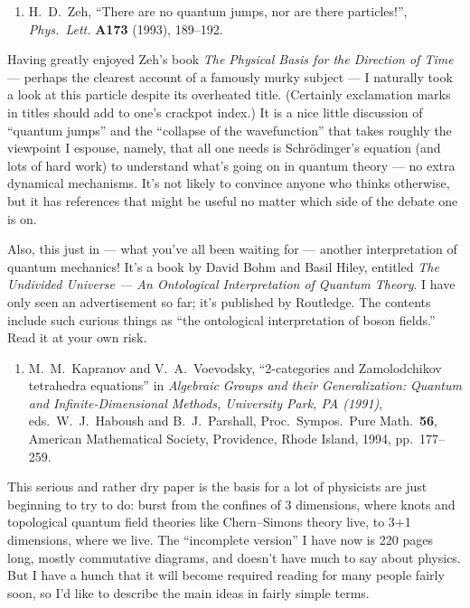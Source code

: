 \documentclass[12pt]{article}
\def\tightlist{}
\begin{document}
\begin{enumerate}
\def\labelenumi{\arabic{enumi})}
\setcounter{enumi}{3}
\tightlist
\item
  H.\ D.\ Zeh, ``There are no quantum jumps, nor are there particles!'', \emph{Phys.\ Lett.} \textbf{A173} (1993), 189--192.
\end{enumerate}
\noindent
Having greatly enjoyed Zeh's book \emph{The Physical Basis for the Direction
of Time} --- perhaps the clearest account of a famously murky subject ---
I naturally took a look at this particle despite its overheated title.
(Certainly exclamation marks in titles should add to one's crackpot
index.) It is a nice little discussion of ``quantum jumps'' and the
``collapse of the wavefunction'' that takes roughly the viewpoint I
espouse, namely, that all one needs is Schr\"odinger's equation (and lots
of hard work) to understand what's going on in quantum theory --- no
extra dynamical mechanisms. It's not likely to convince anyone who
thinks otherwise, but it has references that might be useful no matter
which side of the debate one is on.

Also, this just in --- what you've all been waiting for --- another
interpretation of quantum mechanics! It's a book by David Bohm and Basil
Hiley, entitled \emph{The Undivided Universe --- An Ontological
Interpretation of Quantum Theory}. I have only seen an advertisement so
far; it's published by Routledge. The contents include such curious
things as ``the ontological interpretation of boson fields.'' Read it at
your own risk.

\begin{enumerate}
\def\labelenumi{\arabic{enumi})}
\setcounter{enumi}{4}
\tightlist
\item
  M.\ M.\ Kapranov and V.\ A.\ Voevodsky, 
   ``2-categories and Zamolodchikov tetrahedra equations'' in \emph{Algebraic 
   Groups and their Generalization: Quantum and Infinite-Dimensional Methods, 
   University Park, PA (1991)}, eds.\ W.\ J.\ Haboush and B.\ J.\ Parshall, 
   Proc.\ Sympos.\ Pure Math.\ \textbf{56}, American Mathematical Society,
   Providence, Rhode Island, 1994, pp.\ 177--259.
\end{enumerate}

This serious and rather dry paper is the basis for a lot of physicists
are just beginning to try to do: burst from the confines of 3
dimensions, where knots and topological quantum field theories like
Chern--Simons theory live, to 3+1 dimensions, where we live. The
``incomplete version'' I have now is 220 pages long, mostly commutative
diagrams, and doesn't have much to say about physics. But I have a hunch
that it will become required reading for many people fairly soon, so I'd
like to describe the main ideas in fairly simple terms.
\end{document}

